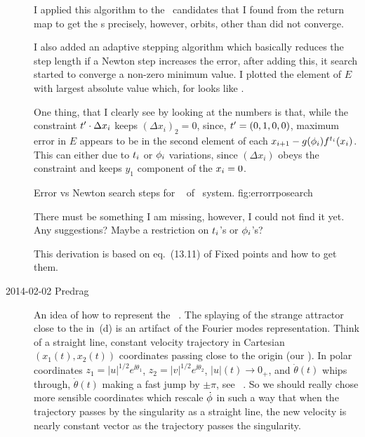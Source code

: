 \begin{description}
I applied this algorithm to the \rpo\ candidates that I found from the return
map to get the \rpo s precisely, however, orbits, other than  did not
converge.

I also added an adaptive stepping algorithm which basically reduces the
step length if a Newton step increases the error, after adding this, it
search started to converge a non-zero minimum value. I plotted the
element of $E$ with largest absolute value which, for  looks
like .

One thing, that I clearly see by looking at the numbers is that, while the
constraint $t'_{} \cdot \Delta x_i$  keeps $(\Delta x_i)_2 = 0$, since,
$t'_{} = (0,1,0,0)$, maximum error in $E$ appears to be in the second
element of each $\ssp_{i+1} - \LieEl (\gSpace_i) \flow{\zeit_i}{\ssp_i}$. This can
either due to $\zeit_i$ or ${\bf \phi}_i$ variations, since $(\Delta x_i)$ obeys the
constraint and keeps $y_1$ component of the $x_i = 0$.

{}{
Error vs Newton search steps for \rpo\  of \twoMode\ system.
}{fig:errorrposearch}

There must be something I am missing, however, I could not find it yet. Any
suggestions? Maybe a restriction on $\zeit_i$'s or ${\bf \phi}_i$'s?

This derivation is based on eq.~(13.11) of
{Fixed points and how to get them}.

\renewcommand{\zeit}{\ensuremath{t}}  %
\item[2014-02-02 Predrag] An idea of how to represent the \twoMode\
\statesp. The splaying of the strange attractor close to the {\sliceBord}
in \reffig{fig:Set1}\,(d) is an artifact of the Fourier modes
representation. Think of a straight line, constant velocity trajectory in
Cartesian $(x_1(\zeit),x_2(\zeit))$ coordinates passing close to the
origin (our {\sliceBord}). In polar coordinates $ {z}_1 = |u|^{1/2}
e^{\ii\theta_1}$, $ {z}_2 = |v|^{1/2} e^{\ii\theta_2}$, $|u|(\zeit) \to
0_+$, and $\dot{\theta}(\zeit)$ whips through,
$\dot{\theta}(\zeit)$ making a fast jump by
$\pm\pi$, see \cLf\ . So we should really chose more
sensible coordinates which rescale $\dot{{\bf \phi}}$ in such a way that
when the trajectory passes by the singularity as a straight line, the new
velocity is nearly constant vector as the trajectory passes the
singularity.


\end{description}
